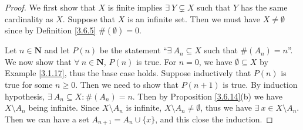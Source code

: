 \begin{proof}
    We first show that \(X\) is finite implies \(\exists\ Y \subsetneq X\) such that \(Y\) has the same cardinality as \(X\).
    Suppose that \(X\) is an infinite set.
    Then we must have \(X \neq \emptyset\) since by Definition \ref{3.6.5} \(\#(\emptyset) = 0\).

    Let \(n \in \mathbf{N}\) and let \(P(n)\) be the statement ``\(\exists\ A_n \subseteq X\) such that \(\#(A_n) = n\)''.
    We now show that \(\forall\ n \in \mathbf{N}\), \(P(n)\) is true.
    For \(n = 0\), we have \(\emptyset \subseteq X\) by Example \ref{3.1.17}, thus the base case holds.
    Suppose inductively that \(P(n)\) is true for some \(n \geq 0\).
    Then we need to show that \(P(n + 1)\) is true.
    By induction hypothesis, \(\exists\ A_n \subseteq X : \#(A_n) = n\).
    Then by Proposition \ref{3.6.14}(b) we have \(X \setminus A_n\) being infinite.
    Since \(X \setminus A_n\) is infinite, \(X \setminus A_n \neq \emptyset\), thus we have \(\exists\ x \in X \setminus A_n\).
    Then we can have a set \(A_{n + 1} = A_n \cup \{x\}\), and this close the induction.


\end{proof}
